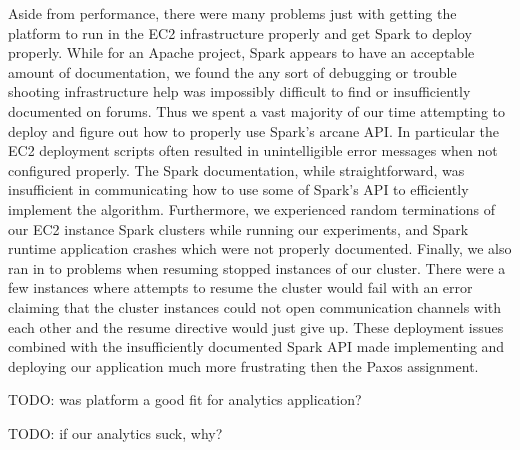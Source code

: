 \documentclass{article}
\begin{document}
Aside from performance, there were many problems just with getting the platform to run in the EC2 infrastructure properly and get Spark to deploy properly.
While for an Apache project, Spark appears to have an acceptable amount of documentation, we found the any sort of debugging or trouble shooting infrastructure help was impossibly difficult to find or insufficiently documented on forums.
Thus we spent a vast majority of our time attempting to deploy and figure out how to properly use Spark's arcane API.
In particular the EC2 deployment scripts often resulted in unintelligible error messages when not configured properly.
The Spark documentation, while straightforward, was insufficient in communicating how to use some of Spark's API to efficiently implement the algorithm.
Furthermore, we experienced random terminations of our EC2 instance Spark clusters while running our experiments, and Spark runtime application crashes which were not properly documented.
Finally, we also ran in to problems when resuming stopped instances of our cluster.
There were a few instances where attempts to resume the cluster would fail with an error claiming that the cluster instances could not open communication channels with each other and the resume directive would just give up.
These deployment issues combined with the insufficiently documented Spark API made implementing and deploying our application much more frustrating then the Paxos assignment.

TODO: was platform a good fit for analytics application?

TODO: if our analytics suck, why?
\end{document}
